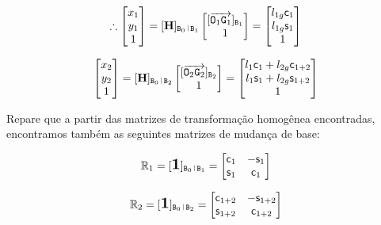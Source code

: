 \begin{itemize}
\begin{itemize}
	\begin{equation}
	\therefore \begin{bmatrix}
	x_1 \\
	y_1 \\
	1 \\
	\end{bmatrix}
	=
	\nmat{\vH}_{\ttB_0 \rl \ttB_1}
	\begin{bmatrix}
	\nmat{\overrightarrow{\ttO_1 \ttG_1}}_{\ttB_1} \\
	1
	\end{bmatrix}
	=
	\begin{bmatrix}
	 l_{1g} \ccos_1 \\
	 l_{1g} \ssin_1 \\
	 1 \\
	\end{bmatrix}
	\end{equation}

	\begin{equation}
	\begin{bmatrix}
	x_2 \\
	y_2 \\
	1 \\
	\end{bmatrix}
	=
	\nmat{\vH}_{\ttB_0 \rl \ttB_2}
	\begin{bmatrix}
	 \nmat{\overrightarrow{\ttO_2 \ttG_2}}_{\ttB_2} \\
	1
	\end{bmatrix}
	=
	\begin{bmatrix}
	 l_1 \ccos_1 + l_{2g} \ccos_{1+2} \\
	 l_1 \ssin_1 + l_{2g} \ssin_{1+2} \\
	 1 \\
	\end{bmatrix}
	\end{equation}

	Repare que a partir das matrizes de transforma\c{c}\~ao homogênea encontradas, encontramos também as seguintes matrizes de mudan\c{c}a de base:
	
	\begin{equation}
	\mR_1 = \nmat{\vone}_{\ttB_0 \rl \ttB_1} =
	\begin{bmatrix}
	 \ccos_1 & -\ssin_1  \\
	 \ssin_1 & \ccos_1  \\
	\end{bmatrix}
	\end{equation}
	
	\begin{equation}
	\mR_2 = \nmat{\vone}_{\ttB_0 \rl \ttB_2} =
	\begin{bmatrix}
	 \ccos_{1+2} & -\ssin_{1+2}  \\
	 \ssin_{1+2} & \ccos_{1+2}  \\
	\end{bmatrix}
	\end{equation}		


\end{itemize}
\end{itemize}

